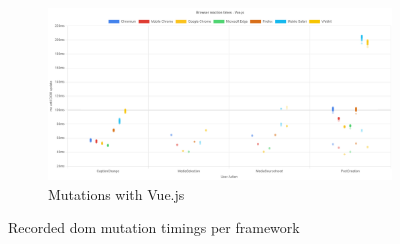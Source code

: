 \documentclass[a4paper, 10pt]{article}
\begin{document}
\begin{figure}[ht!]\ContinuedFloat
  \begin{subfigure}{0.9\linewidth}
    \begin{center}
      \includegraphics[width=\linewidth, keepaspectratio]{img/playwright-results/framework/Vue.png}
    \end{center}
    \caption{Mutations with Vue.js}\label{subfig:PW:Vue}
  \end{subfigure}
  \caption{Recorded \acrshort{dom} mutation timings per framework}
  \label{fig:playwrightResults:frameworks}
\end{figure}
\end{document}
